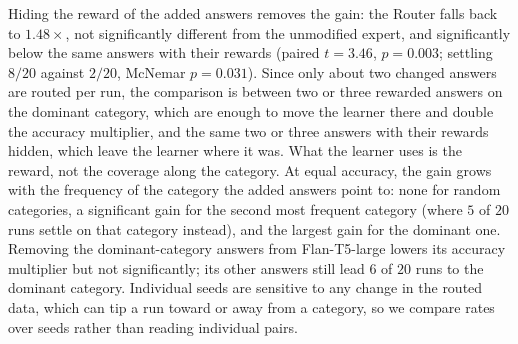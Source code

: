 \documentclass[anon]{alt2027} %
\begin{document}
\begin{table}[ht]
\centering
\caption{Changing $15$ of the expert's $10{,}000$ held-out answers. Tests are
paired over $20$ seeds against the unmodified expert: a paired $t$-test on
Router accuracy and an exact McNemar test on whether the run settles on
$1471$.}
\label{tab:inject}
\small
\setlength{\tabcolsep}{4pt}
\end{table}

Hiding the reward of the added answers removes the gain: the Router falls
back to $1.48\times$, not significantly different from the unmodified expert,
and significantly below the same answers with their rewards (paired $t=3.46$,
$p=0.003$; settling $8/20$ against $2/20$, McNemar $p=0.031$). Since only
about two changed answers are routed per run, the comparison is between two
or three rewarded answers on the dominant category, which are enough to move
the learner there and double the accuracy multiplier, and the same two or three
answers with their rewards hidden, which leave the learner where it was. What
the learner uses is the reward, not the coverage along the category. At equal
accuracy, the gain grows with the frequency of the category the
added answers point to: none for random categories, a significant gain for
the second most frequent category (where $5$ of $20$ runs settle on that
category instead), and the largest gain for the dominant one. Removing the
dominant-category answers from Flan-T5-large lowers its accuracy multiplier but not
significantly; its other answers still lead $6$ of $20$ runs to the
dominant category. Individual seeds are sensitive to any change in the
routed data, which can tip a run toward or away from a category, so we
compare rates over seeds rather than reading individual pairs.
\end{document}
